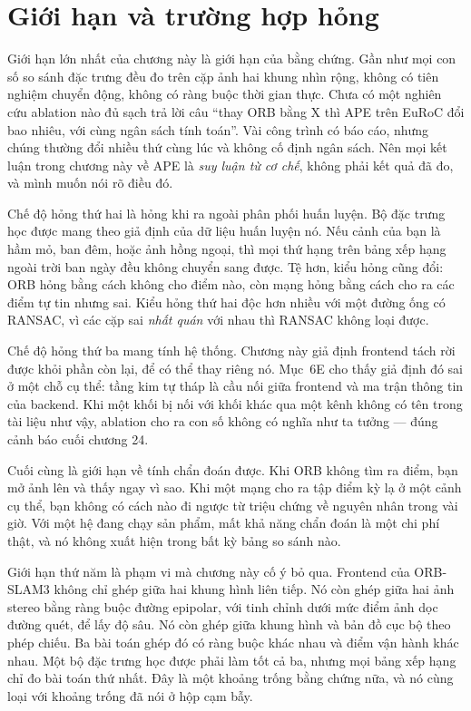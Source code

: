 \documentclass[../../deep_learning.tex]{subfiles}
\begin{document}
\section{Giới hạn và trường hợp hỏng}
Giới hạn lớn nhất của chương này là giới hạn của bằng chứng. Gần như mọi con số so sánh đặc trưng đều đo trên cặp ảnh hai khung nhìn rộng, không có tiên nghiệm chuyển động, không có ràng buộc thời gian thực. Chưa có một nghiên cứu ablation nào đủ sạch trả lời câu ``thay ORB bằng X thì APE trên EuRoC đổi bao nhiêu, với cùng ngân sách tính toán''. Vài công trình có báo cáo, nhưng chúng thường đổi nhiều thứ cùng lúc và không cố định ngân sách. Nên mọi kết luận trong chương này về APE là \emph{suy luận từ cơ chế}, không phải kết quả đã đo, và mình muốn nói rõ điều đó.

Chế độ hỏng thứ hai là hỏng khi ra ngoài phân phối huấn luyện. Bộ đặc trưng học được mang theo giả định của dữ liệu huấn luyện nó. Nếu cảnh của bạn là hầm mỏ, ban đêm, hoặc ảnh hồng ngoại, thì mọi thứ hạng trên bảng xếp hạng ngoài trời ban ngày đều không chuyển sang được. Tệ hơn, kiểu hỏng cũng đổi: ORB hỏng bằng cách không cho điểm nào, còn mạng hỏng bằng cách cho ra các điểm tự tin nhưng sai. Kiểu hỏng thứ hai độc hơn nhiều với một đường ống có RANSAC, vì các cặp sai \emph{nhất quán} với nhau thì RANSAC không loại được.

Chế độ hỏng thứ ba mang tính hệ thống. Chương này giả định frontend tách rời được khỏi phần còn lại, để có thể thay riêng nó. Mục~6E cho thấy giả định đó sai ở một chỗ cụ thể: tầng kim tự tháp là cầu nối giữa frontend và ma trận thông tin của backend. Khi một khối bị nối với khối khác qua một kênh không có tên trong tài liệu như vậy, ablation cho ra con số không có nghĩa như ta tưởng --- đúng cảnh báo cuối chương 24.

Cuối cùng là giới hạn về tính chẩn đoán được. Khi ORB không tìm ra điểm, bạn mở ảnh lên và thấy ngay vì sao. Khi một mạng cho ra tập điểm kỳ lạ ở một cảnh cụ thể, bạn không có cách nào đi ngược từ triệu chứng về nguyên nhân trong vài giờ. Với một hệ đang chạy sản phẩm, mất khả năng chẩn đoán là một chi phí thật, và nó không xuất hiện trong bất kỳ bảng so sánh nào.

Giới hạn thứ năm là phạm vi mà chương này cố ý bỏ qua. Frontend của ORB-SLAM3 không chỉ ghép giữa hai khung hình liên tiếp. Nó còn ghép giữa hai ảnh stereo bằng ràng buộc đường epipolar, với tinh chỉnh dưới mức điểm ảnh dọc đường quét, để lấy độ sâu. Nó còn ghép giữa khung hình và bản đồ cục bộ theo phép chiếu. Ba bài toán ghép đó có ràng buộc khác nhau và điểm vận hành khác nhau. Một bộ đặc trưng học được phải làm tốt cả ba, nhưng mọi bảng xếp hạng chỉ đo bài toán thứ nhất. Đây là một khoảng trống bằng chứng nữa, và nó cùng loại với khoảng trống đã nói ở hộp cạm bẫy.
\end{document}
